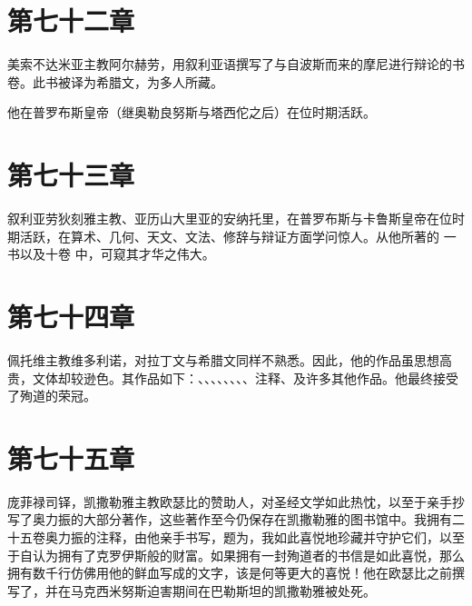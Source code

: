 
\section{第七十二章}

美索不达米亚主教阿尔赫劳，用叙利亚语撰写了与自波斯而来的摩尼进行辩论的书卷。此书被译为希腊文，为多人所藏。\par

他在普罗布斯皇帝（继奥勒良努斯与塔西佗之后）在位时期活跃。\par


\section{第七十三章}

叙利亚劳狄刻雅主教、亚历山大里亚的安纳托里，在普罗布斯与卡鲁斯皇帝在位时期活跃，在算术、几何、天文、文法、修辞与辩证方面学问惊人。从他所著的  一书以及十卷  中，可窥其才华之伟大。\par


\section{第七十四章}

佩托维主教维多利诺，对拉丁文与希腊文同样不熟悉。因此，他的作品虽思想高贵，文体却较逊色。其作品如下：、、、、、、、、注释、及许多其他作品。他最终接受了殉道的荣冠。\par


\section{第七十五章}

庞菲禄司铎，凯撒勒雅主教欧瑟比的赞助人，对圣经文学如此热忱，以至于亲手抄写了奥力振的大部分著作，这些著作至今仍保存在凯撒勒雅的图书馆中。我拥有二十五卷奥力振的注释，由他亲手书写，题为，我如此喜悦地珍藏并守护它们，以至于自认为拥有了克罗伊斯般的财富。如果拥有一封殉道者的书信是如此喜悦，那么拥有数千行仿佛用他的鲜血写成的文字，该是何等更大的喜悦！他在欧瑟比之前撰写了，并在马克西米努斯迫害期间在巴勒斯坦的凯撒勒雅被处死。\par

